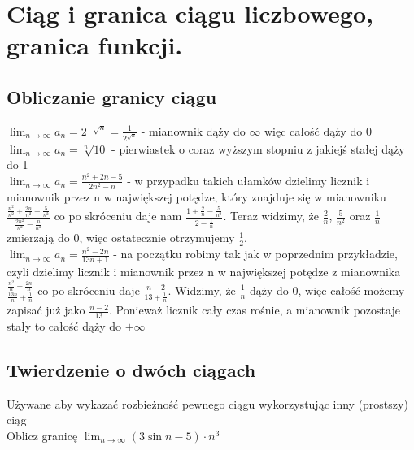 \documentclass[12pt]{article}
\begin{document}
    \newpage

    \section{Ciąg i granica ciągu liczbowego, granica funkcji.}

	\subsection{Obliczanie granicy ciągu}
	$\lim_{n \to \infty} a_{n} = 2^{-\sqrt{n}} = \frac{1}{2^{\sqrt{n}}}$ - mianownik dąży do $\infty$ więc całość dąży do 0 \\

	\noindent $\lim_{n \to \infty} a_{n} = \sqrt[n]{10}$ - pierwiastek o coraz wyższym stopniu z jakiejś stałej dąży do 1 \\

	\noindent $\lim_{n \to \infty} a_{n} = \frac{n^{2} + 2n - 5}{2n^{2} - n}$ - w przypadku takich ułamków dzielimy licznik i mianownik przez n w największej potędze, który znajduje się w mianowniku
	$\frac{\frac{n^{2}}{n^{2}} + \frac{2n}{n^{2}} - \frac{5}{n^{2}}} {\frac{2n^{2}}{n^{2}} - \frac{n}{n^{2}}}$ co po skróceniu daje nam $\frac{1 + \frac{2}{n} - \frac{5}{n^{2}}} {2 - \frac{1}{n}}$.
	Teraz widzimy, że $\frac{2}{n}$, $\frac{5}{n^{2}}$ oraz $\frac{1}{n}$ zmierzają do 0, więc ostatecznie otrzymujemy $\frac{1}{2}$. \\

	\noindent $\lim_{n \to \infty} a_{n} = \frac{n^{2} - 2n}{13n + 1}$ - na początku robimy tak jak w poprzednim przykładzie, czyli dzielimy licznik i mianownik przez n w największej potędze z mianownika
	$\frac{\frac{n^{2}}{n} - \frac{2n}{n}} {\frac{13n}{n} + \frac{1}{n}}$ co po skróceniu daje $\frac{n - 2}{13 + \frac{1}{n}}$. Widzimy, że $\frac{1}{n}$ dąży do 0, więc całość możemy zapisać już jako
	$\frac{n - 2}{13}$. Ponieważ licznik cały czas rośnie, a mianownik pozostaje stały to całość dąży do $+\infty$


	\subsection{Twierdzenie o dwóch ciągach}
	
	Używane aby wykazać rozbieżność pewnego ciągu wykorzystując inny (prostszy) ciąg \\

	\noindent Oblicz granicę $\lim_{n \to \infty} (3 \sin{n} - 5) \cdot n^{3}$ \\
\end{document}
